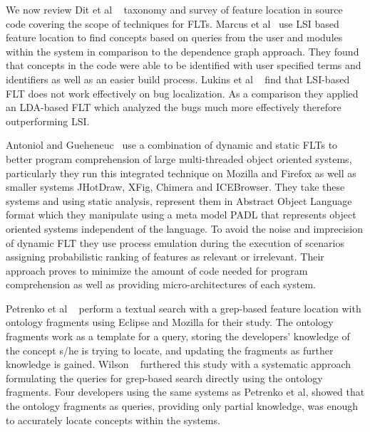 We now review Dit et al ~\cite{dit2013feature} taxonomy and survey of feature
location in source code covering the scope of techniques for FLTs.  Marcus et
al~\cite{1374321} use LSI based feature location to find concepts based on
queries from the user and modules within the system in comparison to the
dependence graph approach. They found that concepts in the code were able to be
identified with user specified terms and identifiers as well as an easier build
process. Lukins et al ~\cite{4656405,6613841} find that LSI-based FLT does
not work effectively on bug localization. As a comparison they applied an
LDA-based FLT which analyzed the bugs much more effectively therefore
outperforming LSI.  

Antoniol and Gueheneuc~\cite{1510131, 1707664} use a combination of dynamic and
static FLTs to better program comprehension of large multi-threaded
object oriented systems, particularly they run this integrated technique on
Mozilla and Firefox as well as smaller systems JHotDraw, XFig, Chimera and
ICEBrowser. They take these systems and using static analysis, represent them
in Abstract Object Language format which they manipulate using a meta model
PADL that represents object oriented systems independent of the language. To
avoid the noise and imprecision of dynamic FLT they use process emulation
during the execution of scenarios assigning probabilistic ranking of features as
relevant or irrelevant. Their approach proves to minimize the amount of code
needed for program comprehension as well as providing micro-architectures of
each system.

Petrenko et al ~\cite{4556113} perform a textual search with a grep-based
feature location with ontology fragments using Eclipse and Mozilla for their
study. The ontology fragments work as a template for a query, storing the
developers' knowledge of the concept s/he is trying to locate, and updating the
fragments as further knowledge is gained. Wilson ~\cite{5609555} furthered this
study with a systematic approach formulating the queries for grep-based search
directly using the ontology fragments. Four developers using the same systems
as Petrenko et al, showed that the ontology fragments as queries, providing
only partial knowledge, was enough to accurately locate concepts within the
systems.  
